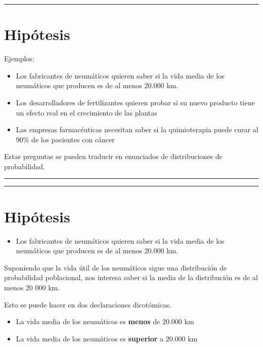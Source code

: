 \documentclass[
]{book}
\providecommand{\tightlist}{%
  \setlength{\itemsep}{0pt}\setlength{\parskip}{0pt}}
\begin{document}
\begin{center}\rule{0.5\linewidth}{0.5pt}\end{center}

\hypertarget{hipuxf3tesis-1}{%
\section{Hipótesis}\label{hipuxf3tesis-1}}

Ejemplos:

\begin{itemize}
\tightlist
\item
  Los fabricantes de neumáticos quieren saber si la vida media de los neumáticos que producen es de al menos 20.000 km.
\item
  Los desarrolladores de fertilizantes quieren probar si su nuevo producto tiene un efecto real en el crecimiento de las plantas
\item
  Las empresas farmacéuticas necesitan saber si la quimioterapia puede curar al 90\% de los pacientes con cáncer
\end{itemize}

Estas preguntas se pueden traducir en enunciados de distribuciones de probabilidad.

\begin{center}\rule{0.5\linewidth}{0.5pt}\end{center}

\begin{center}\rule{0.5\linewidth}{0.5pt}\end{center}

\hypertarget{hipuxf3tesis-2}{%
\section{Hipótesis}\label{hipuxf3tesis-2}}

\begin{itemize}
\tightlist
\item
  Los fabricantes de neumáticos quieren saber si la vida media de los neumáticos que producen es de al menos 20.000 km.
\end{itemize}

Suponiendo que la vida útil de los neumáticos sigue una distribución de probabilidad poblacional, nos interesa saber si la media de la distribución es de al menos 20 000 km.

Esto se puede hacer en dos declaraciones dicotómicas.

\begin{itemize}
\tightlist
\item
  La vida media de los neumáticos es \textbf{menos} de 20.000 km
\item
  La vida media de los neumáticos es \textbf{superior} a 20.000 km
\end{itemize}
\end{document}
